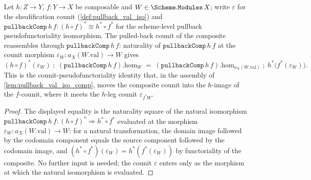 \begin{lemma}
  \label{lem:pullback_val_iso_comp_counit}
  Let \(h : Z \to Y\), \(f : Y \to X\) be composable and \(W \in \Scheme.\mathtt{Modules}\,X\);
  write \(\varepsilon\) for the sheafification counit (\cref{def:pullback_val_iso}) and
  \(\mathtt{pullbackComp}\,h\,f : (h\circ f)^{*} \cong h^{*}\circ f^{*}\) for the scheme-level
  pullback pseudofunctoriality isomorphism. The pulled-back counit of the composite reassembles
  through \(\mathtt{pullbackComp}\,h\,f\): naturality of \(\mathtt{pullbackComp}\,h\,f\) at the
  counit morphism \(\varepsilon_W : a_X(W.\mathrm{val}) \to W\) gives
  \[
    (h\circ f)^{*}(\varepsilon_W) \;\mathbin{;}\; (\mathtt{pullbackComp}\,h\,f).\mathrm{hom}_W
      \;=\;
    (\mathtt{pullbackComp}\,h\,f).\mathrm{hom}_{a_X(W.\mathrm{val})} \;\mathbin{;}\;
      h^{*}\!\bigl(f^{*}(\varepsilon_W)\bigr).
  \]
  This is the counit-pseudofunctoriality identity that, in the assembly of
  \cref{lem:pullback_val_iso_comp}, moves the composite counit into the \(h\)-image of the
  \(f\)-counit, where it meets the \(h\)-leg counit \(\varepsilon_{f^{*}W}\).
\end{lemma}
\begin{proof}
  The displayed equality is the naturality square of the natural isomorphism
  \(\mathtt{pullbackComp}\,h\,f : (h\circ f)^{*} \Rightarrow h^{*}\circ f^{*}\) evaluated at the
  morphism \(\varepsilon_W : a_X(W.\mathrm{val}) \to W\): for a natural transformation, the domain
  image followed by the codomain component equals the source component followed by the codomain
  image, and \((h^{*}\circ f^{*})(\varepsilon_W) = h^{*}(f^{*}(\varepsilon_W))\) by functoriality
  of the composite. No further input is needed; the counit \(\varepsilon\) enters only as the
  morphism at which the natural isomorphism is evaluated.
\end{proof}

